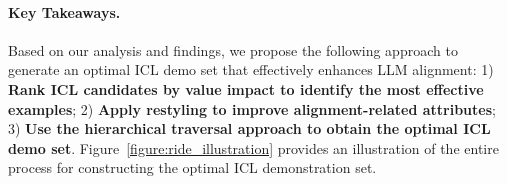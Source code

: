 \paragraph{Key Takeaways.} Based on our analysis and findings, we propose the following approach to generate an optimal ICL demo set that effectively enhances LLM alignment:
1) \textbf{Rank ICL candidates by value impact to identify the most effective examples};
2) \textbf{Apply restyling to improve alignment-related attributes};
3) \textbf{Use the hierarchical traversal approach to obtain the optimal ICL demo set}.
Figure~\ref{figure:ride_illustration} provides an illustration of the entire process for constructing the optimal ICL demonstration set.



